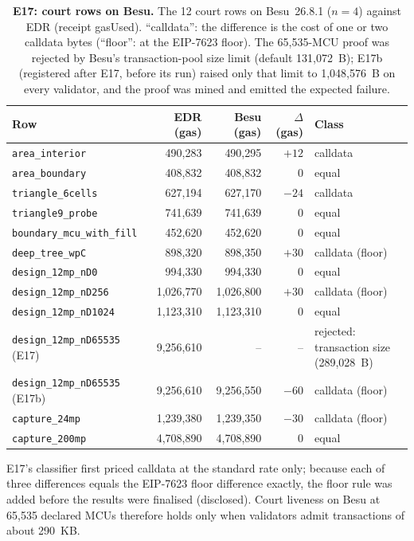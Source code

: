 \documentclass[10pt]{article}
\begin{document}
\begin{table}[!htbp]
\centering\tabsize
\caption{\textbf{E17: court rows on Besu.} The 12 court rows on Besu~26.8.1 ($n=4$) against EDR (receipt gasUsed). ``calldata'': the difference is
the cost of one or two calldata bytes (``floor'': at the EIP-7623 floor). The 65,535-MCU proof was rejected by Besu's
transaction-pool size limit (default 131,072~B); E17b (registered after E17, before its run) raised only that limit to
1,048,576~B on every validator, and the proof was mined and emitted the expected failure.}
\label{tab:x5}
\begin{tabular}{@{}lrrrl@{}}
\toprule
Row & EDR (gas) & Besu (gas) & $\Delta$ (gas) & Class \\
\midrule
\texttt{area\_interior} & 490,283 & 490,295 & $+12$ & calldata \\
\texttt{area\_boundary} & 408,832 & 408,832 & 0 & equal \\
\texttt{triangle\_6cells} & 627,194 & 627,170 & $-24$ & calldata \\
\texttt{triangle9\_probe} & 741,639 & 741,639 & 0 & equal \\
\texttt{boundary\_mcu\_with\_fill} & 452,620 & 452,620 & 0 & equal \\
\texttt{deep\_tree\_wpC} & 898,320 & 898,350 & $+30$ & calldata (floor) \\
\texttt{design\_12mp\_nD0} & 994,330 & 994,330 & 0 & equal \\
\texttt{design\_12mp\_nD256} & 1,026,770 & 1,026,800 & $+30$ & calldata (floor) \\
\texttt{design\_12mp\_nD1024} & 1,123,310 & 1,123,310 & 0 & equal \\
\texttt{design\_12mp\_nD65535} (E17) & 9,256,610 & -- & -- & rejected: transaction size (289,028~B) \\
\texttt{design\_12mp\_nD65535} (E17b) & 9,256,610 & 9,256,550 & $-60$ & calldata (floor) \\
\texttt{capture\_24mp} & 1,239,380 & 1,239,350 & $-30$ & calldata (floor) \\
\texttt{capture\_200mp} & 4,708,890 & 4,708,890 & 0 & equal \\
\bottomrule
\end{tabular}
\end{table}
E17's classifier first priced calldata at the standard rate only; because each of three differences equals the
EIP-7623 floor difference exactly, the floor rule was added before the results were finalised (disclosed). Court
liveness on Besu at 65,535 declared MCUs therefore holds only when validators admit transactions of about 290~KB.
\end{document}
